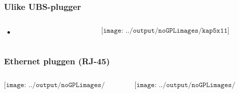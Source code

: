 \documentclass[aspectratio=169,xcolor=dvipsnames]{beamer}
\begin{document}
\begin{frame}
	\frametitle{Ulike UBS-plugger}
	\begin{columns}
		\begin{column}{0.5\textwidth}

			\begin{itemize}
				\item      
			\end{itemize}

			
		\end{column}

		\begin{column}{0.5\textwidth}
	$$\texttt{[image: ../output/noGPLimages/kap5x11]}$$
		\end{column}
	\end{columns}
\end{frame}
\begin{frame}
	\frametitle{Ethernet pluggen (RJ-45)}
	\begin{columns}
		\begin{column}{0.5\textwidth}

	$$\texttt{[image: ../output/noGPLimages/kap5x12]}$$
			
		\end{column}

		\begin{column}{0.5\textwidth}
	$$\texttt{[image: ../output/noGPLimages/kap5x13]}$$
		\end{column}
	\end{columns}
\end{frame}
\end{document}
